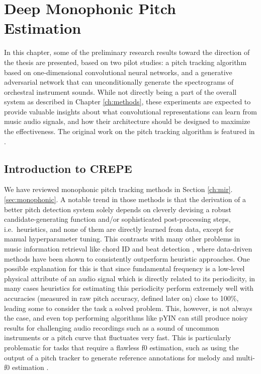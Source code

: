 
\graphicspath{{4-monophonic/figures/}}

\chapter{Deep Monophonic Pitch Estimation}
\label{ch:monophonic}


In this chapter, some of the preliminary research results toward the direction of the thesis are presented, based on two pilot studies: a pitch tracking algorithm based on one-dimensional convolutional neural networks, and a generative adversarial network that can unconditionally generate the spectrograms of orchestral instrument sounds.
While not directly being a part of the overall system as described in Chapter \ref{ch:methods}, these experiments are expected to provide valuable insights about what convolutional representations can learn from music audio signals, and how their architecture should be designed to maximize the effectiveness.
The original work on the pitch tracking algorithm is featured in \cite{kim2018crepe}.


\section{Introduction to CREPE}\label{sec:introduction}

We have reviewed monophonic pitch tracking methods in Section \ref{ch:mir}.\ref{sec:monophonic}.
A notable trend in those methods is that the derivation of a better pitch detection system solely depends on cleverly devising a robust candidate-generating function and/or sophisticated post-processing steps, i.e.~heuristics, and none of them are directly learned from data, except for manual hyperparameter tuning.
This contrasts with many other problems in music information retrieval like chord ID \cite{humphrey2012rethinking} and beat detection \cite{bock2011enhanced}, where data-driven methods have been shown to consistently outperform heuristic approaches.
One possible explanation for this is that since fundamental frequency is a low-level physical attribute of an audio signal which is directly related to its periodicity, in many cases heuristics for estimating this periodicity perform extremely well with accuracies (measured in raw pitch accuracy, defined later on) close to 100\%, leading some to consider the task a solved problem.
This, however, is not always the case, and even top performing algorithms like pYIN can still produce noisy results for challenging audio recordings such as a sound of uncommon instruments or a pitch curve that fluctuates very fast.
This is particularly problematic for tasks that require a flawless f0 estimation, such as using the output of a pitch tracker to generate reference annotations for melody and multi-f0 estimation \cite{salamon2017analysis,bittner2017deepsalience}.

